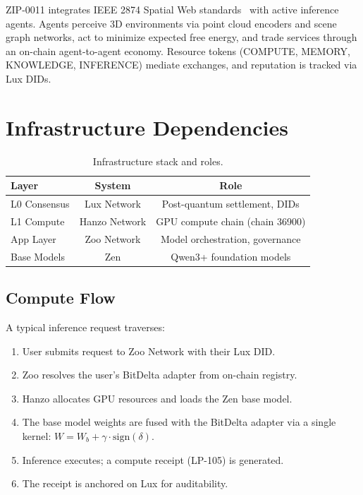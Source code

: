 \documentclass[11pt,letterpaper]{article}
\begin{document}
ZIP-0011 integrates IEEE 2874 Spatial Web standards~\cite{ieee2874} with active inference agents. Agents perceive 3D environments via point cloud encoders and scene graph networks, act to minimize expected free energy, and trade services through an on-chain agent-to-agent economy. Resource tokens (COMPUTE, MEMORY, KNOWLEDGE, INFERENCE) mediate exchanges, and reputation is tracked via Lux DIDs.

\section{Infrastructure Dependencies}

\begin{table}[t]
\centering
\begin{tabular}{lcc}
\toprule
\textbf{Layer} & \textbf{System} & \textbf{Role} \\
\midrule
L0 Consensus & Lux Network & Post-quantum settlement, DIDs \\
L1 Compute & Hanzo Network & GPU compute chain (chain 36900) \\
App Layer & Zoo Network & Model orchestration, governance \\
Base Models & Zen & Qwen3+ foundation models \\
\bottomrule
\end{tabular}
\caption{Infrastructure stack and roles.}
\label{tab:stack}
\end{table}

\subsection{Compute Flow}

A typical inference request traverses:

\begin{enumerate}
    \item User submits request to Zoo Network with their Lux DID.
    \item Zoo resolves the user's BitDelta adapter from on-chain registry.
    \item Hanzo allocates GPU resources and loads the Zen base model.
    \item The base model weights are fused with the BitDelta adapter via a single kernel: $W = W_b + \gamma \cdot \text{sign}(\delta)$.
    \item Inference executes; a compute receipt (LP-105) is generated.
    \item The receipt is anchored on Lux for auditability.
\end{enumerate}
\end{document}
